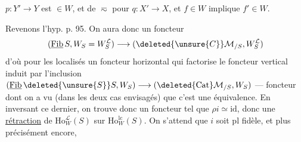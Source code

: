 $p:Y'\longrightarrow Y$ est $\in W$, et de $\eqsim$ pour $q:X'\longrightarrow X$, et $f\in W$ implique  $f'\in W$.

Revenons  l'hyp. p. 95. On aura donc un foncteur
\[
(\underline{\mathrm{Fib}}\,S,W_S=W_S^{\mathcal L})\longrightarrow(\deleted{\unsure{C}}\mathcal M_{/S},W_S^{\mathcal L})
\]
d'où pour les localisés un foncteur horizontal
qui factorise le foncteur vertical induit par l'inclusion $(\underline{\mathrm{Fib}}\,\deleted{\unsure{S}}S,W_S)\longrightarrow(\deleted{\mathrm{Cat}}\mathcal M_{/S},W_S)$ --- foncteur dont on a vu (dans les deux cas envisagés) que c'est une équivalence.
En inversant ce dernier,  on trouve donc un foncteur
\margin{\unsure{*}}
tel que $\rho i\simeq\mathrm{id}$, donc une \uline{rétraction} de $\mathrm{Ho}^{\mathcal L}_W(S)$ sur $\mathrm{Ho}^{\mathrm{lc}}_W(S)$. On s'attend que $i$ soit pl fidèle, et plus précisément encore,
